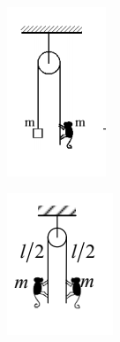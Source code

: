 \begin{problem}{1}
\end{problem}



\begin{problem}{3}
	
	\begin{figure}[h!]
	\centering
	\begin{subfigure}{.4\textwidth}
		\centering
		\includegraphics[width=0.5\linewidth]{class7/lev_445}
		\caption{}
		\label{fig:lev445}	
	\end{subfigure}
	\begin{subfigure}{.4\textwidth}
		\centering
		\includegraphics[width=0.5\linewidth]{class7/lev_447}
		\caption{}
		\label{fig:lev447}

\end{subfigure}
\end{figure}
\end{problem}

